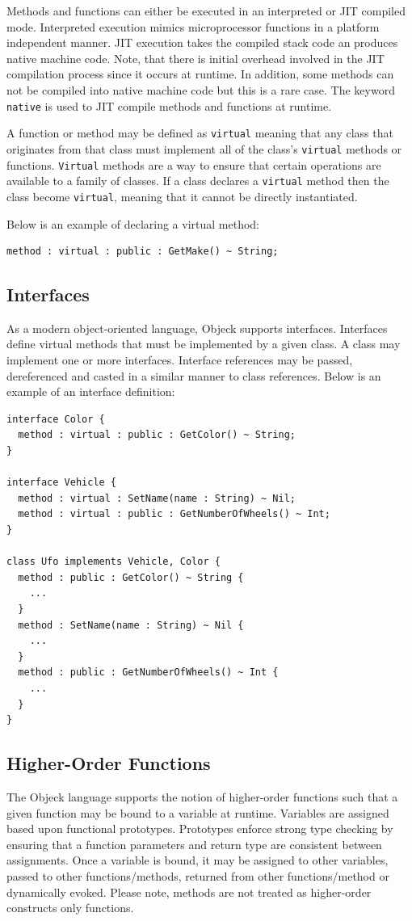 \documentclass[11pt]{article}
\begin{document}
Methods and functions can either be executed in an interpreted or JIT
compiled mode. Interpreted execution mimics microprocessor functions
in a platform independent manner. JIT execution takes the compiled
stack code an produces native machine code. Note, that there is
initial overhead involved in the JIT compilation process since it
occurs at runtime. In addition, some methods can not be compiled into
native machine code but this is a rare case.  The keyword
\texttt{native} is used to JIT compile methods and functions at
runtime.

A function or method may be defined as \texttt{virtual} meaning that
any class that originates from that class must implement all of the
class's \texttt{virtual} methods or functions.  \texttt{Virtual}
methods are a way to ensure that certain operations are available to a
family of classes. If a class declares a \texttt{virtual} method then
the class become \texttt{virtual}, meaning that it cannot be directly
instantiated.

Below is an example of declaring a virtual method:
\begin{verbatim}
method : virtual : public : GetMake() ~ String;
\end{verbatim}

\subsection{Interfaces}
As a modern object-oriented language, Objeck supports interfaces.
Interfaces define virtual methods that must be implemented by a given
class.  A class may implement one or more interfaces.  Interface
references may be passed, dereferenced and casted in a similar manner to class
references.  Below is an example of an interface definition:

\begin{verbatim}
interface Color {
  method : virtual : public : GetColor() ~ String;
}

interface Vehicle {
  method : virtual : SetName(name : String) ~ Nil;
  method : virtual : public : GetNumberOfWheels() ~ Int;
}

class Ufo implements Vehicle, Color {
  method : public : GetColor() ~ String {
    ...
  }
  method : SetName(name : String) ~ Nil {
    ...
  }
  method : public : GetNumberOfWheels() ~ Int {
    ...
  }
}
\end{verbatim}

\subsection{Higher-Order Functions}
The Objeck language supports the notion of higher-order functions such
that a given function may be bound to a variable at runtime.
Variables are assigned based upon functional prototypes.  Prototypes
enforce strong type checking by ensuring that a function parameters
and return type are consistent between assignments.  Once a variable
is bound, it may be assigned to other variables, passed to other
functions/methods, returned from other functions/method or dynamically
evoked.  Please note, methods are not treated as higher-order
constructs only functions.
\end{document}
